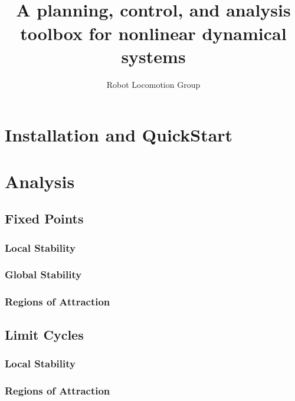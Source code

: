 \documentclass{book}
\title{{\Huge \drake}\\ {\huge A planning, control, and
    analysis toolbox for nonlinear dynamical systems}}
\author{\Large Robot Locomotion Group}
\begin{document}
\maketitle

\tableofcontents 




\chapter{Installation and QuickStart}




\chapter{Analysis}

\section{Fixed Points}

\subsection{Local Stability}

\subsection{Global Stability}

\subsection{Regions of Attraction}

\section{Limit Cycles}

\subsection{Local Stability}

\subsection{Regions of Attraction}
\end{document}
